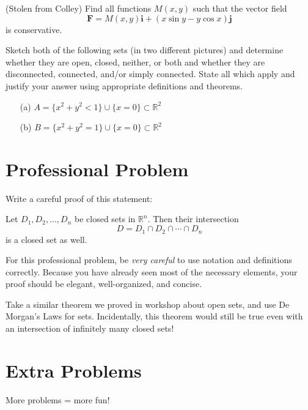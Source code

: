 \documentclass{ximera}
\begin{document}
\begin{problem}
(Stolen from Colley) Find all functions $M(x,y)$ such that the vector field
\[
\mathbf{F}=M(x,y)\mathbf{i}+(x\sin y-y\cos x)\mathbf{j}
\]
is conservative.
\end{problem}

\begin{problem}
Sketch both of the following sets (in two different pictures) and determine whether they are open, closed, neither, or both and whether they are disconnected, connected, and/or simply connected. State all which apply and justify your answer using appropriate definitions and theorems.
\begin{enumerate}
\item[(a)] $A=\{x^2+y^2<1\}\cup\{x=0\}\subset\mathbb{R}^2$
\item[(b)] $B=\{x^2+y^2=1\}\cup\{x=0\}\subset\mathbb{R}^2$
\end{enumerate}
\end{problem}

\section{Professional Problem}

\begin{problem}
Write a careful proof of this statement:

\begin{theorem}
Let $D_1,D_2,...,D_n$ be closed sets in $\mathbb{R}^n$. Then their intersection
\[
D=D_1\cap D_2\cap\cdots\cap D_n
\]
is a closed set as well.
\end{theorem}

For this professional problem, be \emph{very careful} to use notation and definitions correctly. Because you have already seen most of the necessary elements, your proof should be elegant, well-organized, and concise.

\begin{hint}
Take a similar theorem we proved in workshop about open sets, and use De Morgan's Laws for sets. Incidentally, this theorem would still be true even with an intersection of infinitely many closed sets!
\end{hint}
\end{problem}

\section{Extra Problems}

\begin{problem}
More problems = more fun!
\end{problem}
\end{document}
